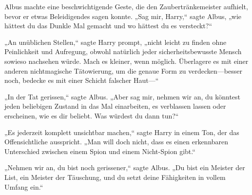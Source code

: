 Albus machte eine beschwichtigende Geste, die den Zaubertränkemeister aufhielt, bevor er etwas Beleidigendes sagen konnte. „Sag mir, Harry,“ sagte Albus, „wie hättest du das Dunkle Mal gemacht und wo hättest du es versteckt?“

„An unüblichen Stellen,“ sagte Harry prompt, „nicht leicht zu finden ohne Peinlichkeit und Aufregung, obwohl natürlich jeder sicherheitsbewusste Mensch sowieso nachsehen würde. Mach es kleiner, wenn möglich. Überlagere es mit einer anderen nichtmagische Tätowierung, um die genaue Form zu verdecken—besser noch, bedecke es mit einer Schicht falscher Haut—“

„In der Tat gerissen,“ sagte Albus. „Aber sag mir, nehmen wir an, du könntest jeden beliebigen Zustand in das Mal einarbeiten, es verblassen lassen oder erscheinen, wie es dir beliebt. Was würdest du dann tun?“

„Es jederzeit komplett unsichtbar machen,“ sagte Harry in einem Ton, der das Offensichtliche ausspricht. „Man will doch nicht, dass es einen erkennbaren Unterschied zwischen einem Spion und einem Nicht-Spion gibt.“

„Nehmen wir an, du bist noch gerissener,“ sagte Albus. „Du bist ein Meister der List, ein Meister der Täuschung, und du setzt deine Fähigkeiten in vollem Umfang ein.“

